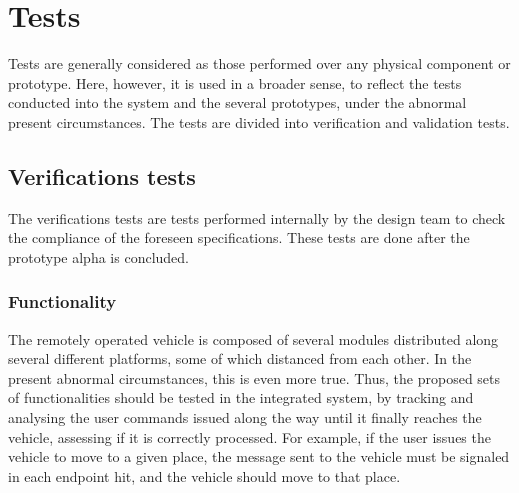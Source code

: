 \section{Tests}%
\label{sec:org3e2776f}
Tests are generally considered as those performed over any physical
component or prototype. Here, however, it is used in a broader sense, to reflect the tests
conducted into the system and the several prototypes, under the abnormal present
circumstances. The tests are divided into verification and validation tests.
\subsection{Verifications tests}%
\label{sec:orge9c79e2}
The verifications tests are tests performed internally by the design team to
check the compliance of the foreseen specifications. These tests are done after
the prototype alpha is concluded.

\subsubsection{Functionality}%
\label{sec:functionality}
The remotely operated vehicle is composed of several modules distributed along
several different platforms, some of which distanced from each other. In the
present abnormal circumstances, this is even more true. Thus, the proposed sets
of functionalities should be tested in the integrated system, by tracking and
analysing the user commands issued along the way until it finally reaches the
vehicle, assessing if it is correctly processed. For example, if the user issues
the vehicle to move to a given place, the message sent to the vehicle must be
signaled in each endpoint hit, and the vehicle should move to that place.

